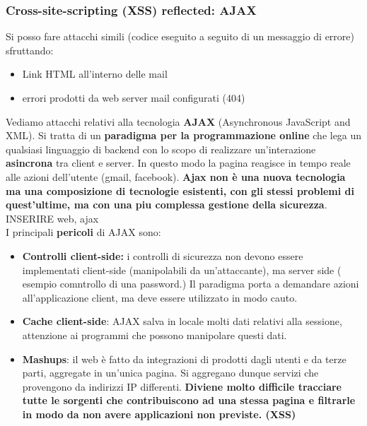 \documentclass[12pt]{article}
\begin{document}
			\subsubsection{Cross-site-scripting (XSS) reflected: AJAX}
				Si posso fare attacchi simili (codice eseguito a seguito di un messaggio di errore) sfruttando:
				\begin{itemize}
					\item Link HTML all'interno delle mail
					\item errori prodotti da web server mail configurati (404)
				\end{itemize}
				Vediamo attacchi relativi alla tecnologia \textbf{AJAX} (Asynchronous JavaScript and XML). Si tratta di un \textbf{paradigma per la programmazione online} che lega un qualsiasi linguaggio di backend con lo scopo di realizzare un'interazione \textbf{asincrona} tra client e server. In questo modo la pagina reagisce in tempo reale alle azioni dell'utente (gmail, facebook). \textbf{Ajax non è una nuova tecnologia ma una composizione di tecnologie esistenti, con gli stessi problemi di quest'ultime, ma con una piu complessa gestione della sicurezza}. \\ 
				
				INSERIRE web, ajax \\
				
				I principali \textbf{pericoli} di AJAX sono:
				\begin{itemize}
					\item \textbf{Controlli client-side:} i controlli di sicurezza non devono essere implementati client-side (manipolabili da un'attaccante), ma server side ( esempio comntrollo di una password.) Il paradigma porta a demandare azioni all'applicazione client, ma deve essere utilizzato in modo cauto.
					\item \textbf{Cache client-side}: AJAX salva in locale molti dati relativi alla sessione, attenzione ai programmi che possono manipolare questi dati.
					\item \textbf{Mashups}: il web è fatto da integrazioni di prodotti dagli utenti e da terze parti, aggregate in un'unica pagina. Si aggregano dunque servizi che provengono da indirizzi IP differenti. \textbf{Diviene molto difficile tracciare tutte le sorgenti che contribuiscono ad una stessa pagina e filtrarle in modo da non avere applicazioni non previste. (XSS)}  
				\end{itemize}
\end{document}

